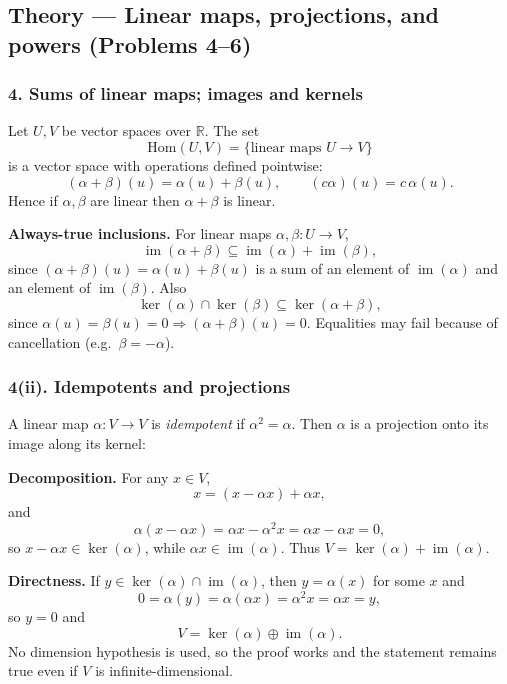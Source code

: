 \documentclass[12pt,a4paper]{article}
\theoremstyle{plain}
\theoremstyle{definition}      %
\begin{document}
\subsection*{Theory — Linear maps, projections, and powers (Problems 4--6)}

\subsubsection*{4. Sums of linear maps; images and kernels}

Let $U,V$ be vector spaces over $\mathbb R$. The set
\[
\mathrm{Hom}(U,V)=\{\text{linear maps }U\to V\}
\]
is a vector space with operations defined pointwise:
\[
(\alpha+\beta)(u)=\alpha(u)+\beta(u),\qquad (c\alpha)(u)=c\,\alpha(u).
\]
Hence if $\alpha,\beta$ are linear then $\alpha+\beta$ is linear.

\medskip
\noindent\textbf{Always-true inclusions.}
For linear maps $\alpha,\beta:U\to V$,
\[
\operatorname{im}(\alpha+\beta)\subseteq \operatorname{im}(\alpha)+\operatorname{im}(\beta),
\]
since $(\alpha+\beta)(u)=\alpha(u)+\beta(u)$ is a sum of an element of $\operatorname{im}(\alpha)$ and an element of
$\operatorname{im}(\beta)$. Also
\[
\ker(\alpha)\cap\ker(\beta)\subseteq \ker(\alpha+\beta),
\]
since $\alpha(u)=\beta(u)=0\Rightarrow (\alpha+\beta)(u)=0$.
Equalities may fail because of cancellation (e.g.\ $\beta=-\alpha$).

\bigskip

\subsubsection*{4(ii). Idempotents and projections}

A linear map $\alpha:V\to V$ is \emph{idempotent} if $\alpha^2=\alpha$.
Then $\alpha$ is a projection onto its image along its kernel:

\medskip
\noindent\textbf{Decomposition.}
For any $x\in V$,
\[
x=(x-\alpha x)+\alpha x,
\]
and
\[
\alpha(x-\alpha x)=\alpha x-\alpha^2x=\alpha x-\alpha x=0,
\]
so $x-\alpha x\in\ker(\alpha)$, while $\alpha x\in\operatorname{im}(\alpha)$.
Thus $V=\ker(\alpha)+\operatorname{im}(\alpha)$.

\medskip
\noindent\textbf{Directness.}
If $y\in\ker(\alpha)\cap\operatorname{im}(\alpha)$, then $y=\alpha(x)$ for some $x$ and
\[
0=\alpha(y)=\alpha(\alpha x)=\alpha^2x=\alpha x=y,
\]
so $y=0$ and
\[
V=\ker(\alpha)\oplus\operatorname{im}(\alpha).
\]
No dimension hypothesis is used, so the proof works and the statement remains true even if $V$ is infinite-dimensional.
\end{document}
